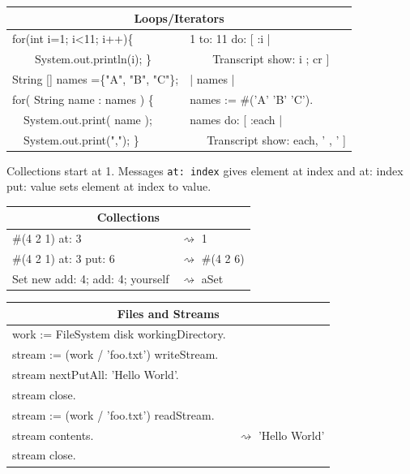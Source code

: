 \documentclass[notumble]{leaflet}
\newcommand{\ct}[1]{{\textsf{#1}}\xspace}
\newcommand{\code}[1]{\foreignlanguage{english}{\texttt{#1}}}
\begin{document}
\noindent
\begin{tabularx}{\linewidth}{@{}lX@{}}
        \toprule
        \multicolumn{2}{c}{\textbf{Loops/Iterators}}\\
        \midrule
         for(int i=1; i<11; i++)\{ & 1 to: 11 do: [ :i | \\
      \ \ \ \    System.out.println(i); \}&\ \ \ \ Transcript show: i ; cr ] \\
      \midrule
String [] names =\{"A", "B", "C"\};& | names | \\  
for( String name : names ) \{ &names := \#('A' 'B' 'C').\\
   \ \      System.out.print( name ); & names do: [ :each |\\
    \ \     System.out.print(","); \} & \ \ \ Transcript show: each, ' , ' ]\\
     \midrule
\end{tabularx}

Collections start at 1. Messages \code{at: index} gives element at index and \ct{at: index put: value} sets element at index to value.

\noindent
\begin{tabularx}{\linewidth}{@{}lX@{}}
     \toprule
      \multicolumn{2}{c}{\textbf{Collections}}\\
      \midrule
     \textcolor{string}{\#(4 2 1) at: 3}& $\rightsquigarrow$ 1 \\
     \textcolor{string}{\#(4 2 1) at: 3 put: 6}& $\rightsquigarrow$ \#(4 2 6) \\
     \textcolor{string}{Set new add: 4; add: 4; yourself}& $\rightsquigarrow$ aSet \\
     \midrule
\end{tabularx}

\noindent
\begin{tabularx}{\linewidth}{@{}lX@{}}
     \toprule
     \multicolumn{2}{c}{\textbf{Files and Streams}}\\
      \midrule
work := FileSystem disk workingDirectory. \\
stream := (work / 'foo.txt') writeStream. \\
stream nextPutAll: 'Hello World'. \\
stream close. \\
stream := (work / 'foo.txt') readStream. \\
stream contents. & $\rightsquigarrow$ 'Hello World' \\
stream close.
\end{tabularx}
\end{document}
